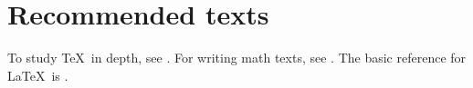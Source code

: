 \documentclass{scrartcl}
\begin{document}
\section*{Recommended texts}
To study \TeX\ in depth, see \autocite{DK86}. For writing math texts,
see \autocite{DK89}. The basic reference for \LaTeX\ is \autocite{Lamport}.
\printbibliography
\end{document}
